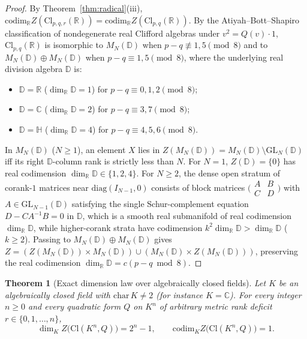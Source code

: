 \documentclass[11pt,a4paper]{article}
\newtheorem{theorem}{Theorem}[section]
\theoremstyle{definition}
\theoremstyle{remark}
\newcommand{\Cl}{\mathrm{Cl}}
\newcommand{\codim}{\mathrm{codim}}
\newcommand{\GL}{\mathrm{GL}}
\begin{document}
\begin{proof}
By Theorem~\ref{thm:radical}(iii), $\codim_{\mathbb{R}} Z(\Cl_{p,q,r}(\mathbb{R})) = \codim_{\mathbb{R}} Z(\Cl_{p,q}(\mathbb{R}))$. By the Atiyah--Bott--Shapiro classification of nondegenerate real Clifford algebras under $v^2 = Q(v)\cdot 1$, $\Cl_{p,q}(\mathbb{R})$ is isomorphic to $M_N(\mathbb{D})$ when $p - q \not\equiv 1, 5 \pmod 8$ and to $M_N(\mathbb{D}) \oplus M_N(\mathbb{D})$ when $p - q \equiv 1, 5 \pmod 8$, where the underlying real division algebra $\mathbb{D}$ is:
\begin{itemize}
\setlength{\itemsep}{2pt}\setlength{\parskip}{0pt}
\item $\mathbb{D} = \mathbb{R}$ ($\dim_{\mathbb{R}} \mathbb{D} = 1$) for $p - q \equiv 0, 1, 2 \pmod 8$;
\item $\mathbb{D} = \mathbb{C}$ ($\dim_{\mathbb{R}} \mathbb{D} = 2$) for $p - q \equiv 3, 7 \pmod 8$;
\item $\mathbb{D} = \mathbb{H}$ ($\dim_{\mathbb{R}} \mathbb{D} = 4$) for $p - q \equiv 4, 5, 6 \pmod 8$.
\end{itemize}
In $M_N(\mathbb{D})$ ($N \ge 1$), an element $X$ lies in $Z(M_N(\mathbb{D})) = M_N(\mathbb{D}) \setminus \GL_N(\mathbb{D})$ iff its right $\mathbb{D}$-column rank is strictly less than $N$. For $N = 1$, $Z(\mathbb{D}) = \{0\}$ has real codimension $\dim_{\mathbb{R}} \mathbb{D} \in \{1, 2, 4\}$. For $N \ge 2$, the dense open stratum of corank-$1$ matrices near $\mathrm{diag}(I_{N-1}, 0)$ consists of block matrices $\bigl(\begin{smallmatrix} A & B \\ C & D \end{smallmatrix}\bigr)$ with $A \in \GL_{N-1}(\mathbb{D})$ satisfying the single Schur-complement equation $D - C A^{-1} B = 0$ in $\mathbb{D}$, which is a smooth real submanifold of real codimension $\dim_{\mathbb{R}} \mathbb{D}$, while higher-corank strata have codimension $k^2 \dim_{\mathbb{R}} \mathbb{D} > \dim_{\mathbb{R}} \mathbb{D}$ ($k \ge 2$). Passing to $M_N(\mathbb{D}) \oplus M_N(\mathbb{D})$ gives $Z = (Z(M_N(\mathbb{D})) \times M_N(\mathbb{D})) \cup (M_N(\mathbb{D}) \times Z(M_N(\mathbb{D})))$, preserving the real codimension $\dim_{\mathbb{R}} \mathbb{D} = c(p - q \bmod 8)$.
\end{proof}

\begin{theorem}[Exact dimension law over algebraically closed fields]\label{thm:complex-law}
Let $K$ be an algebraically closed field with $\mathrm{char}\,K \neq 2$ (for instance $K = \mathbb{C}$). For every integer $n \ge 0$ and every quadratic form $Q$ on $K^n$ of arbitrary metric rank deficit $r \in \{0, 1, \dots, n\}$,
\[
\dim_K Z\bigl(\Cl(K^n, Q)\bigr) = 2^n - 1, \qquad \codim_K Z\bigl(\Cl(K^n, Q)\bigr) = 1.
\]
\end{theorem}
\end{document}
